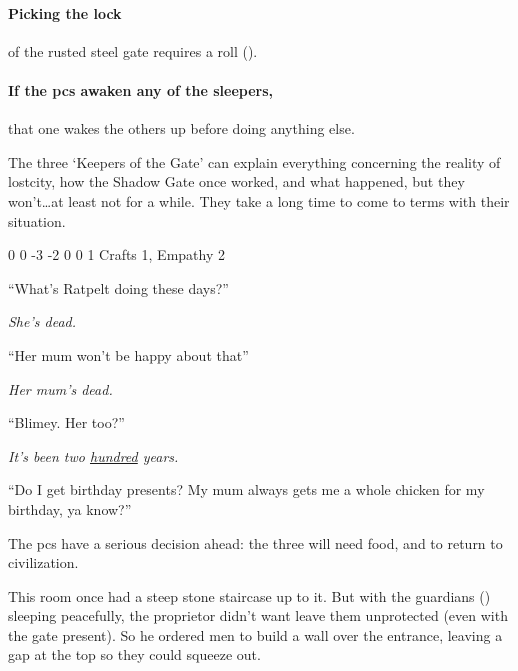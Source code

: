 \paragraph{Picking the lock}
of the rusted steel gate requires a  roll (\tn[16]).

\paragraph{If the \glspl{pc} awaken any of the sleepers,}
that one wakes the others up before doing anything else.

The three `Keepers of the Gate' can explain everything concerning the reality of \gls{lostcity}, how the Shadow Gate once worked, and what happened, but they won't\ldots at least not for a while.
They take a long time to come to terms with their situation.

\setcounter{Intelligence}{-2}
{0}%
{0}%
{{-3}%
{-2}%
{0}}%
{0}%
{1}%
{Crafts 1, Empathy 2}%
{\Dagger}%
{}

\begin{speechtext}
  ``What's Ratpelt doing these days?''

  \textit{\raggedleft{} She's dead.}

  ``Her mum won't be happy about that''

  \textit{\raggedleft{} Her mum's dead.}

  ``Blimey. Her too?''

  \textit{\raggedleft{} It's been two \underline{hundred} years.}

  ``Do I get birthday presents?
  My mum always gets me a whole chicken for my birthday, ya know?''
\end{speechtext}

The \glspl{pc} have a serious decision ahead: the three will need food, and to return to civilization.


\begin{exampletext}
  This room once had a steep stone staircase up to it.
  But with the guardians () sleeping peacefully, the proprietor didn't want leave them unprotected (even with the gate present).
  So he ordered men to build a wall over the entrance, leaving a gap at the top so they could squeeze out.
\end{exampletext}

